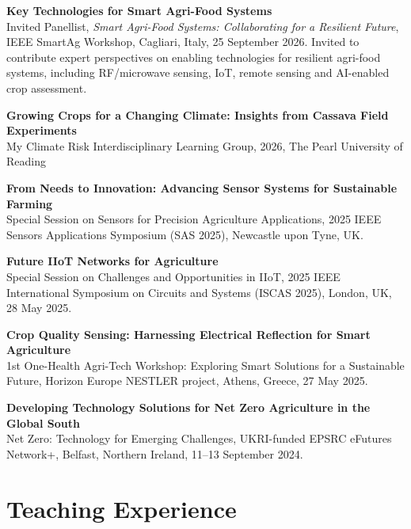 \documentclass[a4paper,11pt]{article}
\newcommand{\invitedtalk}[2]{%
    \textbf{#1}\\[1.5mm]
    #2\par
    \vspace{5pt}
}
\begin{document}
\invitedtalk
{Key Technologies for Smart Agri-Food Systems}
{Invited Panellist, \textit{Smart Agri-Food Systems: Collaborating for a Resilient Future}, IEEE SmartAg Workshop, Cagliari, Italy, 25 September 2026. Invited to contribute expert perspectives on enabling technologies for resilient agri-food systems, including RF/microwave sensing, IoT, remote sensing and AI-enabled crop assessment.}

\invitedtalk
{Growing Crops for a Changing Climate: Insights from Cassava Field Experiments}
{My Climate Risk Interdisciplinary Learning Group, 2026, The Pearl University of Reading}

\invitedtalk
{From Needs to Innovation: Advancing Sensor Systems for Sustainable Farming}
{Special Session on Sensors for Precision Agriculture Applications, 2025 IEEE Sensors Applications Symposium (SAS 2025), Newcastle upon Tyne, UK.}

\invitedtalk
{Future IIoT Networks for Agriculture}
{Special Session on Challenges and Opportunities in IIoT, 2025 IEEE International Symposium on Circuits and Systems (ISCAS 2025), London, UK, 28 May 2025.}

\invitedtalk
{Crop Quality Sensing: Harnessing Electrical Reflection for Smart Agriculture}
{1st One-Health Agri-Tech Workshop: Exploring Smart Solutions for a Sustainable Future, Horizon Europe NESTLER project, Athens, Greece, 27 May 2025.}

\invitedtalk
{Developing Technology Solutions for Net Zero Agriculture in the Global South}
{Net Zero: Technology for Emerging Challenges, UKRI-funded EPSRC eFutures Network+, Belfast, Northern Ireland, 11--13 September 2024.}


\section{Teaching Experience}
\end{document}
